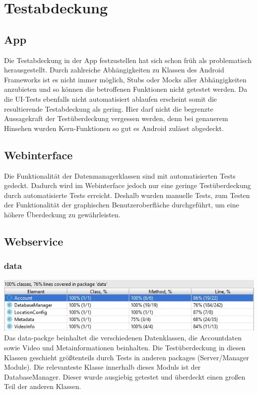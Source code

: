 \chapter{Testabdeckung}
\section{App}
Die Testabdeckung in der App festzustellen hat sich schon früh als problematisch herausgestellt. Durch zahlreiche Abhängigkeiten zu Klassen des Android Frameworks ist es nicht immer möglich, Stubs oder Mocks aller Abhängigkeiten anzubieten und so können die betroffenen Funktionen nicht getestet werden. Da die UI-Tests ebenfalls nicht automatisiert ablaufen erscheint somit die resultierende Testabdeckung als gering. Hier darf nicht die begrenzte Aussagekraft der Testüberdeckung vergessen werden, denn bei genauerem Hinsehen wurden Kern-Funktionen so gut es Android zulässt abgedeckt.

\section{Webinterface}
Die Funktionalität der Datenmanagerklassen sind mit automatisierten Tests gedeckt. Dadurch wird im Webinterface jedoch nur eine geringe Testüberdeckung durch automatisierte Tests erreicht. Deshalb wurden manuelle Tests, zum Testen der Funktionalität der graphischen Benutzeroberfläche durchgeführt, um eine höhere Überdeckung zu gewährleisten.

\section{Webservice}
\subsection{data}
\includegraphics[scale=0.8]{resources/data.jpg}
Das data-packge beinhaltet die verschiedenen Datenklassen, die Accountdaten sowie Video und Metainformationen beinhalten. Die Testüberdeckung in diesen Klassen geschieht größtenteils durch Tests in anderen packages (Server/Manager Module). Die relevanteste Klasse innerhalb dieses Moduls ist der DatabaseManager. Dieser wurde ausgiebig getestet und überdeckt einen großen Teil der anderen  Klassen.
